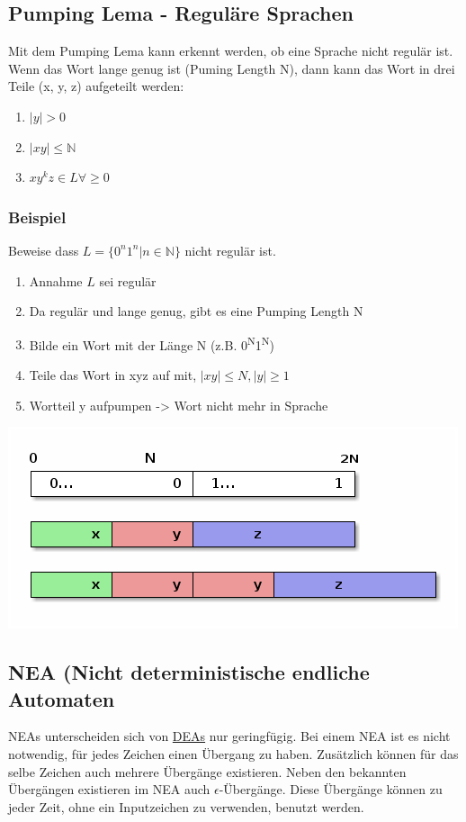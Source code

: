 \documentclass[11pt,twoside,landscape]{article}
\begin{document}
\begin{multicols}{3}
\subsection*{Pumping Lema - Reguläre Sprachen}
\label{sec:orgc67387f}
Mit dem Pumping Lema kann erkennt werden, ob eine Sprache nicht regulär ist. Wenn das Wort lange genug ist (Puming Length N), dann kann das Wort in drei Teile (x, y, z) aufgeteilt werden:
\begin{enumerate}
\item \(|y| > 0\)
\item \(|xy| \leq \mathbb{N}\)
\item \(xy^kz \in L  \forall \geq 0\)
\end{enumerate}

\subsubsection*{Beispiel}
\label{sec:orgcee3caf}
Beweise dass \(L = \{0^n1^n | n \in \mathbb{N}\}\) nicht regulär ist.

\begin{enumerate}
\item Annahme \(L\) sei regulär
\item Da regulär und lange genug, gibt es eine Pumping Length N
\item Bilde ein Wort mit der Länge N (z.B. 0\textsuperscript{N}1\textsuperscript{N})
\item Teile das Wort in xyz auf mit, \(|xy| \leq N, |y| \geq 1\)
\item Wortteil y aufpumpen -> Wort nicht mehr in Sprache
\end{enumerate}

\begin{center}
\includegraphics[width=.9\linewidth]{static/img/autospr/pumping_lema.png}
\end{center}

\subsection*{NEA (Nicht deterministische endliche Automaten}
\label{sec:orgade1970}
NEAs unterscheiden sich von \hyperref[sec:orgef7322d]{DEAs} nur geringfügig. Bei einem NEA ist es nicht notwendig, für jedes Zeichen einen Übergang zu haben. Zusätzlich können für das selbe Zeichen auch mehrere Übergänge existieren. Neben den bekannten Übergängen existieren im NEA auch \(\epsilon\)-Übergänge. Diese Übergänge können zu jeder Zeit, ohne ein Inputzeichen zu verwenden, benutzt werden.


\end{multicols}
\end{document}
